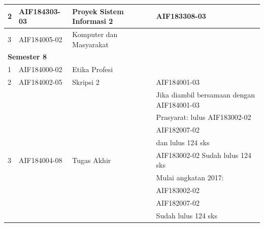 \begin{table}[H]
\begin{tabular}{|p{0.5cm}|p{2.85cm}|p{4.95cm}|p{2.7cm}|p{2.7cm}|}
2 & AIF184303-03 & Proyek Sistem Informasi 2 &  & AIF183308-03 \\ \hline
3 & AIF184005-02 & Komputer dan Masyarakat &  &  \\ \hline
\multicolumn{5}{|l|}{\textbf{Semester 8}} \\ \hline
1 & AIF184000-02 & Etika Profesi &  &  \\ \hline
2 & AIF184002-05 & Skripsi 2 &  & AIF184001-03 \\ 
 &  &  &  & Jika diambil bersamaan dengan AIF184001-03 \\ 
 &  &  &  & Prasyarat: lulus AIF183002-02 \\ 
 &  &  &  & AIF182007-02 \\
 &  &  &  & dan lulus 124 sks \\ \hline
3 & AIF184004-08 & Tugas Akhir &  & AIF183002-02 Sudah lulus 124 sks \\ 
 &  &  &  & Mulai angkatan 2017: \\
 &  &  &  & AIF183002-02 \\
 &  &  &  & AIF182007-02 \\
 &  &  &  & Sudah lulus 124 sks \\ \hline
		\end{tabular}
	\label{tab:DaftarMataKuliahWajibDanPrasyaratnya2}
\end{table}

